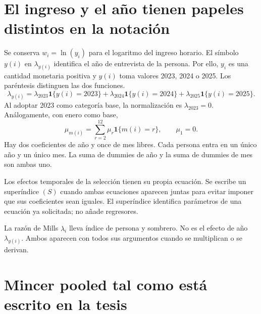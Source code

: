 \documentclass[11pt,a4paper]{article}
\begin{document}
\clearpage
\section{El ingreso y el año tienen papeles distintos en la notación}

Se conserva $w_i=\ln(y_i)$ para el logaritmo del ingreso horario. El símbolo $y(i)$ en $\lambda_{y(i)}$ identifica el año de entrevista de la persona. Por ello, $y_i$ es una cantidad monetaria positiva y $y(i)$ toma valores 2023, 2024 o 2025. Los paréntesis distinguen las dos funciones.
\[
\lambda_{y(i)}
=\lambda_{2023}\mathbf1\{y(i)=2023\}
+\lambda_{2024}\mathbf1\{y(i)=2024\}
+\lambda_{2025}\mathbf1\{y(i)=2025\}.
\]
Al adoptar 2023 como categoría base, la normalización es $\lambda_{2023}=0$. Análogamente, con enero como base,
\[
\mu_{m(i)}=\sum_{r=2}^{12}\mu_r\mathbf1\{m(i)=r\},\qquad \mu_1=0.
\]
Hay dos coeficientes de año y once de mes libres. Cada persona entra en un único año y un único mes. La suma de dummies de año y la suma de dummies de mes son ambas uno.

Los efectos temporales de la selección tienen su propia ecuación. Se escribe un superíndice $(S)$ cuando ambas ecuaciones aparecen juntas para evitar imponer que sus coeficientes sean iguales. El superíndice identifica parámetros de una ecuación ya solicitada; no añade regresores.

La razón de Mills $\widehat\lambda_i$ lleva índice de persona y sombrero. No es el efecto de año $\lambda_{y(i)}$. Ambos aparecen con todos sus argumentos cuando se multiplican o se derivan.

\clearpage
\section{Mincer pooled tal como está escrito en la tesis}
\end{document}
